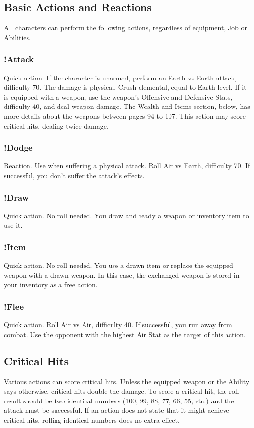 \begin{multicols}{2}
\subsection{Basic Actions and Reactions}
All characters can perform the following
actions, regardless of equipment, Job or Abilities.

\subsubsection{!Attack}
Quick action. If the character is unarmed,
perform an Earth vs Earth attack, difficulty 70. The
damage is physical, Crush-elemental, equal to
Earth level. If it is equipped with a weapon, use the
weapon’s Offensive and Defensive Stats, difficulty
40, and deal weapon damage. The Wealth and
Items section, below, has more details about the
weapons between pages 94 to 107. This action
may score critical hits, dealing twice damage.

\subsubsection{!Dodge}
Reaction. Use when suffering a physical
attack. Roll Air vs Earth, difficulty 70. If successful,
you don’t suffer the attack’s effects.

\subsubsection{!Draw}
Quick action. No roll needed. You draw and
ready a weapon or inventory item to use it.

\subsubsection{!Item}
Quick action. No roll needed. You use a
drawn item or replace the equipped weapon with
a drawn weapon. In this case, the exchanged
weapon is stored in your inventory as a free action.

\subsubsection{!Flee}
Quick action. Roll Air vs Air, difficulty 40. If
successful, you run away from combat. Use the
opponent with the highest Air Stat as the target of
this action.

\subsection{Critical Hits}
Various actions can score critical hits.
Unless the equipped weapon or the Ability says
otherwise, critical hits double the damage. To
score a critical hit, the roll result should be two
identical numbers (100, 99, 88, 77, 66, 55, etc.) and
the attack must be successful. If an action does not
state that it might achieve critical hits, rolling
identical numbers does no extra effect.


\end{multicols}
